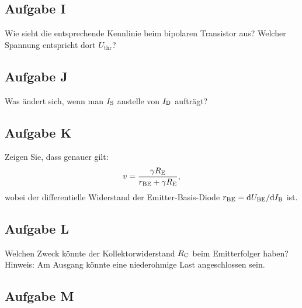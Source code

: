 \fehlt

\subsection{Aufgabe I}

\begin{problem}
	Wie sieht die entsprechende Kennlinie beim bipolaren Transistor aus?
	Welcher Spannung entspricht dort $U_\text{thr}$?
\end{problem}

\fehlt

\subsection{Aufgabe J}

\begin{problem}
	Was ändert sich, wenn man $I_\text S$ anstelle von $I_\text D$ aufträgt?
\end{problem}

\fehlt

\subsection{Aufgabe K}

\begin{problem}
	Zeigen Sie, dass genauer gilt:
	\begin{equation}
		\label{eq:3_4-11}
		v = \frac{\gamma R_\text E}{r_\text{BE} + \gamma R_\text E},
	\end{equation}
	wobei der differentielle Widerstand der Emitter-Basis-Diode $r_\text{BE} =
	\mathrm d U_\text{BE} / \mathrm d I_\text B$ ist.
\end{problem}

\fehlt

\subsection{Aufgabe L}

\begin{problem}
	Welchen Zweck könnte der Kollektorwiderstand $R_\text C$ beim Emitterfolger
	haben? Hinweis: Am Ausgang könnte eine niederohmige Last angeschlossen
	sein.
\end{problem}

\fehlt

\subsection{Aufgabe M}

